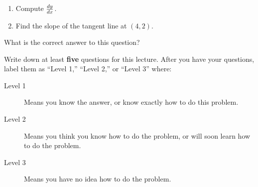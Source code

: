\documentclass{ximera}
\begin{document}
\begin{question}
\begin{enumerate}
\item Compute $\frac{dy}{dx}$.
\item Find the slope of the tangent line at $(4,2)$.
\end{enumerate}
\end{question}




\begin{question}
  What is the correct answer to this question?

  
    \begin{multipleChoice}
    \end{multipleChoice}  
  
\end{question}


\begin{question}
Write down at least \textbf{five} questions for this lecture. After
you have your questions, label them as ``Level 1,'' ``Level 2,'' or ``Level 3'' where:
\begin{description}
\item[Level 1] Means you know the answer, or know exactly how to do this problem.
\item[Level 2] Means you think you know how to do the problem, or will soon learn how to do the problem.
\item[Level 3] Means you have no idea how to do the problem. 
\end{description}
  \begin{freeResponse}
  \end{freeResponse}
\end{question}
\end{document}
